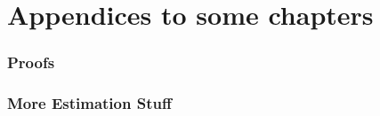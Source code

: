 \part*{Appendices to some chapters}

\section{Proofs}

\blindtext
\section{More Estimation Stuff}

\blindtext
